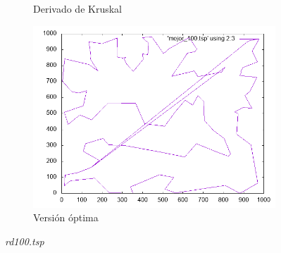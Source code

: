 \documentclass[12pt,spanish]{article}
\begin{document}
\begin{figure}[H]
\begin{subfigure}[b]{0.36\textwidth}
\caption{Derivado de Kruskal}
\end{subfigure}
\quad
\begin{subfigure}[b]{0.36\textwidth}
\includegraphics[width=\textwidth]{rd100_mejor.png}
\caption{Versión óptima}
\end{subfigure}
\caption{\textit{rd100.tsp}}
\end{figure}
\end{document}
